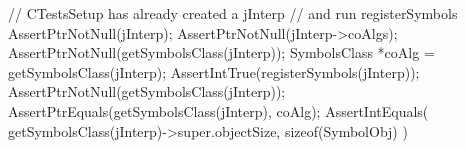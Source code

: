 
\startCTest
  // CTestsSetup has already created a jInterp
  // and run registerSymbols
  AssertPtrNotNull(jInterp);
  AssertPtrNotNull(jInterp->coAlgs);
  AssertPtrNotNull(getSymbolsClass(jInterp));
  SymbolsClass *coAlg = getSymbolsClass(jInterp);
  AssertIntTrue(registerSymbols(jInterp));
  AssertPtrNotNull(getSymbolsClass(jInterp));
  AssertPtrEquals(getSymbolsClass(jInterp), coAlg);
  AssertIntEquals(
    getSymbolsClass(jInterp)->super.objectSize,
    sizeof(SymbolObj)
  )
\stopCTest
\stopTestCase
\stopTestSuite
